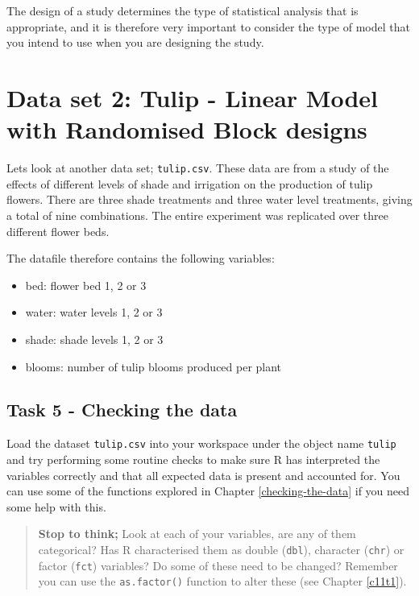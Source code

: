 \documentclass[
]{book}
\providecommand{\tightlist}{%
  \setlength{\itemsep}{0pt}\setlength{\parskip}{0pt}}
\begin{document}
The design of a study determines the type of statistical analysis that is appropriate, and it is therefore very important to consider the type of model that you intend to use when you are designing the study.

\section{Data set 2: Tulip - Linear Model with Randomised Block designs}\label{data-set-2-tulip---linear-model-with-randomised-block-designs}

Lets look at another data set; \texttt{tulip.csv}. These data are from a study of the effects of different levels of shade and irrigation on the production of tulip flowers. There are three shade treatments and three water level treatments, giving a total of nine combinations. The entire experiment was replicated over three different flower beds.

The datafile therefore contains the following variables:

\begin{itemize}
\tightlist
\item
  bed: flower bed 1, 2 or 3
\item
  water: water levels 1, 2 or 3
\item
  shade: shade levels 1, 2 or 3
\item
  blooms: number of tulip blooms produced per plant
\end{itemize}

\subsection{Task 5 - Checking the data}\label{task-5---checking-the-data}

Load the dataset \texttt{tulip.csv} into your workspace under the object name \texttt{tulip} and try performing some routine checks to make sure R has interpreted the variables correctly and that all expected data is present and accounted for. You can use some of the functions explored in Chapter \ref{checking-the-data} if you need some help with this.

\begin{quote}
\textbf{Stop to think;}
Look at each of your variables, are any of them categorical? Has R characterised them as double (\texttt{dbl}), character (\texttt{chr}) or factor (\texttt{fct}) variables?
Do some of these need to be changed? Remember you can use the \texttt{as.factor()} function to alter these (see Chapter \ref{c11t1}).
\end{quote}
\end{document}
